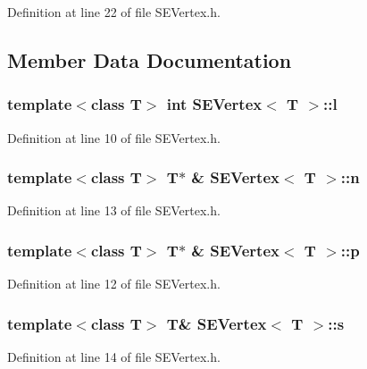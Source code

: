 Definition at line 22 of file S\+E\+Vertex.\+h.



\subsection{Member Data Documentation}
\subsubsection[{l}]{\setlength{\rightskip}{0pt plus 5cm}template$<$class T$>$ int {\bf S\+E\+Vertex}$<$ T $>$\+::l}\label{class_s_e_vertex_ac9be902d91d8facfaa9111ff74b39ff4}


Definition at line 10 of file S\+E\+Vertex.\+h.

\subsubsection[{n}]{\setlength{\rightskip}{0pt plus 5cm}template$<$class T$>$ T$\ast$ \& {\bf S\+E\+Vertex}$<$ T $>$\+::n}\label{class_s_e_vertex_a8d53b5fbaa777fcd14bb473403690a18}


Definition at line 13 of file S\+E\+Vertex.\+h.

\subsubsection[{p}]{\setlength{\rightskip}{0pt plus 5cm}template$<$class T$>$ T$\ast$ \& {\bf S\+E\+Vertex}$<$ T $>$\+::p}\label{class_s_e_vertex_a0b363346e22baf0069f3c3302ba82282}


Definition at line 12 of file S\+E\+Vertex.\+h.

\subsubsection[{s}]{\setlength{\rightskip}{0pt plus 5cm}template$<$class T$>$ T\& {\bf S\+E\+Vertex}$<$ T $>$\+::s}\label{class_s_e_vertex_acd1402e7969a5a930d85d57ca9e4ea62}


Definition at line 14 of file S\+E\+Vertex.\+h.

